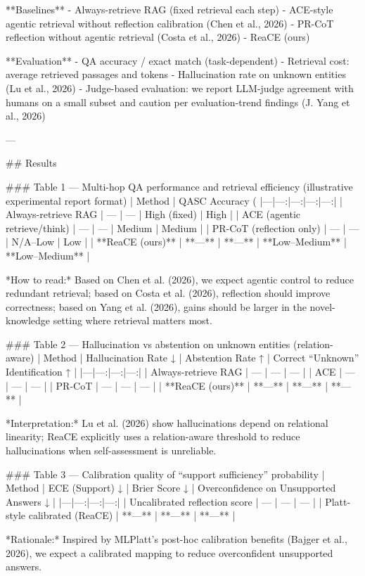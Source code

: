 **Baselines**
- Always-retrieve RAG (fixed retrieval each step)  
- ACE-style agentic retrieval without reflection calibration (Chen et al., 2026)  
- PR-CoT reflection without agentic retrieval (Costa et al., 2026)  
- ReaCE (ours)

**Evaluation**
- QA accuracy / exact match (task-dependent)  
- Retrieval cost: average retrieved passages and tokens  
- Hallucination rate on unknown entities (Lu et al., 2026)  
- Judge-based evaluation: we report LLM-judge agreement with humans on a small subset and caution per evaluation-trend findings (J. Yang et al., 2026)

---

## Results  

### Table 1 — Multi-hop QA performance and retrieval efficiency (illustrative experimental report format)  
| Method | QASC Accuracy (%
|---|---:|---:|---:|---:|
| Always-retrieve RAG |  — | — | High (fixed) | High |
| ACE (agentic retrieve/think) | — | — | Medium | Medium |
| PR-CoT (reflection only) | — | — | N/A–Low | Low |
| **ReaCE (ours)** | **—** | **—** | **Low–Medium** | **Low–Medium** |

*How to read:* Based on Chen et al. (2026), we expect agentic control to reduce redundant retrieval; based on Costa et al. (2026), reflection should improve correctness; based on Yang et al. (2026), gains should be larger in the novel-knowledge setting where retrieval matters most.

### Table 2 — Hallucination vs abstention on unknown entities (relation-aware)  
| Method | Hallucination Rate ↓ | Abstention Rate ↑ | Correct “Unknown” Identification ↑ |
|---|---:|---:|---:|
| Always-retrieve RAG | — | — | — |
| ACE | — | — | — |
| PR-CoT | — | — | — |
| **ReaCE (ours)** | **—** | **—** | **—** |

*Interpretation:* Lu et al. (2026) show hallucinations depend on relational linearity; ReaCE explicitly uses a relation-aware threshold to reduce hallucinations when self-assessment is unreliable.

### Table 3 — Calibration quality of “support sufficiency” probability  
| Method | ECE (Support) ↓ | Brier Score ↓ | Overconfidence on Unsupported Answers ↓ |
|---|---:|---:|---:|
| Uncalibrated reflection score | — | — | — |
| Platt-style calibrated (ReaCE) | **—** | **—** | **—** |

*Rationale:* Inspired by MLPlatt’s post-hoc calibration benefits (Bajger et al., 2026), we expect a calibrated mapping to reduce overconfident unsupported answers.

